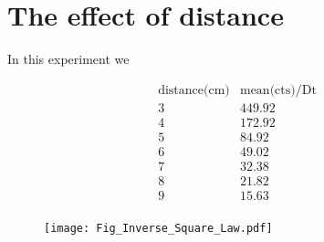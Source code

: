\section{The effect of distance}


In this experiment we



\begin{displaymath}
\begin{array}{cc}
 \text{distance(cm)} & \text{mean(cts)/Dt} 
   \\
3  &  449.92   \\
4  &  172.92   \\
5  &  84.92    \\
6  &  49.02    \\
7  &  32.38    \\
8  &  21.82    \\
9  &  15.63    \\
\end{array}
\end{displaymath}

\begin{figure}
  \texttt{[image: Fig\_Inverse\_Square\_Law.pdf]}
\end{figure}




